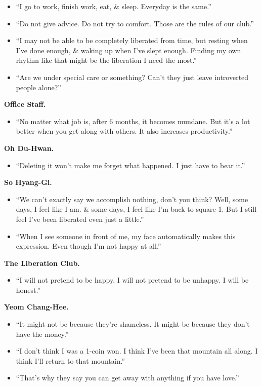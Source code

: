 \documentclass{article}
\begin{document}
\begin{enumerate}
\begin{itemize}
		\item ``I go to work, finish work, eat, \& sleep. Everyday is the same.''
		\item ``Do not give advice. Do not try to comfort. Those are the rules of our club.''
		\item ``I may not be able to be completely liberated from time, but resting when I've done enough, \& waking up when I've slept enough. Finding my own rhythm like that might be the liberation I need the most.''
		\item ``Are we under special care or something? Can't they just leave introverted people alone?''
	\end{itemize}
	{\bf Office Staff.}
	\begin{itemize}
		\item ``No matter what job is, after 6 months, it becomes mundane. But it's a lot better when you get along with others. It also increases productivity.''
	\end{itemize}
	{\bf Oh Du-Hwan.}
	\begin{itemize}
		\item ``Deleting it won't make me forget what happened. I just have to bear it.''
	\end{itemize}
	{\bf So Hyang-Gi.}
	\begin{itemize}
		\item ``We can't exactly say we accomplish nothing, don't you think? Well, some days, I feel like I am. \& some days, I feel like I'm back to square 1. But I still feel I've been liberated even just a little.''
		\item ``When I see someone in front of me, my face automatically makes this expression. Even though I'm not happy at all.''
	\end{itemize}
	{\bf The Liberation Club.}
	\begin{itemize}
		\item ``I will not pretend to be happy. I will not pretend to be unhappy. I will be honest.''
	\end{itemize}
	{\bf Yeom Chang-Hee.}
	\begin{itemize}
		\item ``It might not be because they're shameless. It might be because they don't have the money.''
		\item ``I don't think I was a 1-coin won. I think I've been that mountain all along. I think I'll return to that mountain.''
		\item ``That's why they say you can get away with anything if you have love.''

\end{itemize}
\end{enumerate}
\end{document}
